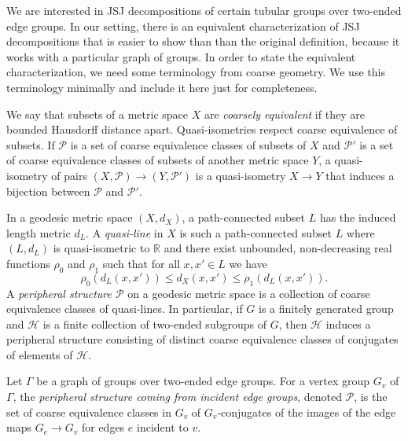 \documentclass[10pt]{article}
\def\reals{{\mathbb R}}
\theoremstyle{definition}
\begin{document}
We are interested in JSJ decompositions of certain tubular groups over two-ended edge groups. In our setting, there is an equivalent characterization of JSJ decompositions that is easier to show than than the original definition, because it works with a particular graph of groups. In order to state the equivalent characterization, we need some terminology from coarse geometry. We use this terminology minimally and include it here just for completeness.  

We say that subsets of a metric space $X$ are \textit{coarsely equivalent} if they are bounded Hausdorff distance apart. Quasi-isometries respect coarse equivalence of subsets. If $\mathcal{P}$ is a set of coarse equivalence classes of subsets of $X$ and $\mathcal{P}'$ is a set of coarse equivalence classes of subsets of another metric space $Y$, a quasi-isometry of pairs $(X, \mathcal{P}) \to (Y, \mathcal{P}')$ is a quasi-isometry $X \to Y$ that induces a bijection between $\mathcal{P}$ and $\mathcal{P}'.$

In a geodesic metric space $(X, d_X)$, a path-connected subset $L$ has the induced length metric $d_L$. A \textit{quasi-line} in $X$ is such a path-connected subset $L$ where $(L, d_L)$ is quasi-isometric to $\reals$ and there exist unbounded, non-decreasing real functions $\rho_0$ and $\rho_1$ such that for all $x, x'\in L$ we have $$\rho_0(d_L(x,x')) \leq d_X(x, x') \leq \rho_1(d_L(x,x')).$$ A \textit{peripheral structure $\mathcal{P}$} on a geodesic metric space is a collection of coarse equivalence classes of quasi-lines. In particular, if $G$ is a finitely generated group and $\mathcal{H}$ is a finite collection of two-ended subgroups of $G$, then $\mathcal{H}$ induces a peripheral structure consisting of distinct coarse equivalence classes of conjugates of elements of $\mathcal{H}$. 

Let $\Gamma$ be a graph of groups over two-ended edge groups. For a vertex group $G_v$ of $\Gamma$, the \textit{peripheral structure coming from incident edge groups}, denoted $\mathcal{P}$, is the set of  coarse equivalence classes in $G_v$ of $G_v$-conjugates of the images of the edge maps $G_{e} \to G_v$ for edges $e$ incident to $v$. 
\end{document}
